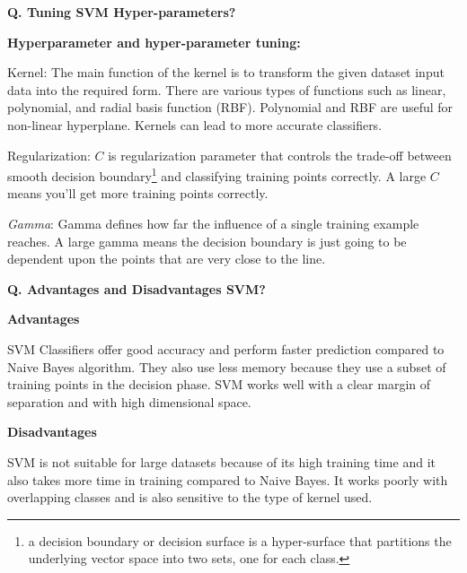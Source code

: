\begin{frame}[fragile]{\textbf{Q. Tuning SVM Hyper-parameters?}}
  \vspace{.4em}
  \begin{wideitemize}
    \item \textbf{Hyperparameter and hyper-parameter tuning:}
    \begin{wideitemize}
      \item Kernel: The main function of the kernel is to transform the given dataset input data into the required form. There are various types of functions such as linear, polynomial, and radial basis function (RBF). Polynomial and RBF are useful for non-linear hyperplane. Kernels can lead to more accurate classifiers.
      \item Regularization: $C$ is regularization parameter that controls the trade-off between smooth decision
      boundary\footnote{a decision boundary or decision surface is a hyper-surface that partitions
      the underlying vector space into two sets, one for each class.} and classifying training
      points correctly. A large $C$ means you'll get more training points correctly.
      \item \textit{Gamma}: Gamma defines how far the influence of a single training example reaches.
      A large gamma means the decision boundary is just going to be dependent upon the points that
      are very close to the line.
    \end{wideitemize}
  \end{wideitemize}

\end{frame}

\begin{frame}[fragile]{\textbf{Q. Advantages and Disadvantages SVM?}}
  \vspace{.4em}
  \begin{wideitemize}
    \item \textbf{Advantages}
    \begin{wideitemize}
      \item SVM Classifiers offer good accuracy and perform faster prediction
      compared to Naive Bayes algorithm. They also use less memory because they
      use a subset of training points in the decision phase. SVM works well with
      a clear margin of separation and with high dimensional space.
    \end{wideitemize}
    \item \textbf{Disadvantages}
    \begin{wideitemize}
      \item SVM is not suitable for large datasets because of its high training
      time and it also takes more time in training compared to Naive Bayes. It
      works poorly with overlapping classes and is also sensitive to the type
      of kernel used.
    \end{wideitemize}
  \end{wideitemize}

\end{frame}


